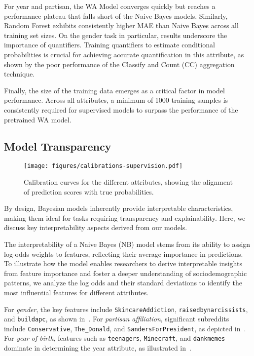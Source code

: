 For year and partisan, the WA Model converges quickly but reaches a performance plateau that falls short of the Naive Bayes models.
Similarly, Random Forest exhibits consistently higher MAE than Naive Bayes across all training set sizes. %
On the gender task in particular, results underscore the importance of quantifiers.
Training quantifiers to estimate conditional probabilities is crucial for achieving accurate quantification in this attribute, as shown by the poor performance of the Classify and Count (CC) aggregation technique.

Finally, the size of the training data emerges as a critical factor in model performance.
Across all attributes, a minimum of \num{1000} training samples is consistently required for supervised models to surpass the performance of the pretrained WA model.


\subsection{Model Transparency}

\begin{figure*}[ht!]
\centering
\texttt{[image: figures/calibrations-supervision.pdf]}
\caption{Calibration curves for the different attributes, showing the alignment of prediction scores with true probabilities.}
\label{fig:calibration-year}
\end{figure*}

By design, Bayesian models inherently provide interpretable characteristics, making them ideal for tasks requiring transparency and explainability.
Here, we discuss key interpretability aspects derived from our models.

The interpretability of a Naive Bayes (NB) model stems from its ability to assign log-odds weights to features, reflecting their average importance in predictions.
To illustrate how the model enables researchers to derive interpretable insights from feature importance and foster a deeper understanding of sociodemographic patterns, we analyze the log odds and their standard deviations to identify the most influential features for different attributes.

For \textit{gender}, the key features include \texttt{SkincareAddiction}, \texttt{raisedbynarcissists}, and \texttt{buildapc}, as shown in~.
For \textit{partisan affiliation}, significant subreddits include \texttt{Conservative}, \texttt{The\_Donald}, and \texttt{SandersForPresident}, as depicted in~.
For \textit{year of birth}, features such as \texttt{teenagers}, \texttt{Minecraft}, and \texttt{dankmemes} dominate in determining the year attribute, as illustrated in~.

